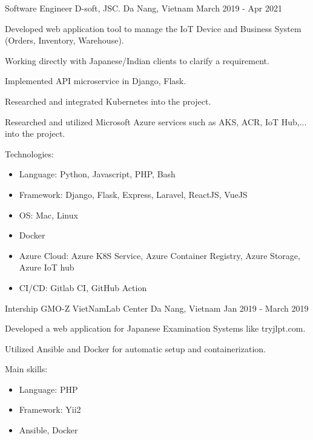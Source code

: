\begin{cventries}
    \cventry
    {Software Engineer} %
    {D-soft, JSC.} %
    {Da Nang, Vietnam} %
    {March 2019 - Apr 2021} %
    {
      \begin{cvitems} %
        \item {Developed web application tool to manage the IoT Device and Business System (Orders, Inventory, Warehouse).}
        \item {Working directly with Japanese/Indian clients to clarify a requirement.}
        \item {Implemented API microservice in Django, Flask.}
        \item {Researched and integrated Kubernetes into the project.}
        \item {Researched and utilized Microsoft Azure services such as AKS, ACR, IoT Hub,... into the project.}
        \item {Technologies:
            \begin{itemize}
                \item {Language: Python, Javascript, PHP, Bash}
                \item {Framework: Django, Flask, Express, Laravel, ReactJS, VueJS}
                \item {OS: Mac, Linux}
                \item {Docker}
                \item {Azure Cloud: Azure K8S Service, Azure Container Registry, Azure Storage, Azure IoT hub}
                \item {CI/CD: Gitlab CI, GitHub Action}
            \end{itemize}
        }
      \end{cvitems}
    }

    \cventry
    {Intership} %
    {GMO-Z VietNamLab Center} %
    {Da Nang, Vietnam} %
    {Jan 2019 - March 2019} %
    {
      \begin{cvitems} %
        \item {Developed a web application for Japanese Examination Systems like tryjlpt.com.}
        \item {Utilized Ansible and Docker for automatic setup and containerization.}
        \item {Main skills:
            \begin{itemize}
                \item {Language: PHP}
                \item {Framework: Yii2}
                \item {Ansible, Docker}
            \end{itemize}
        }
      \end{cvitems}
    }

\end{cventries}
